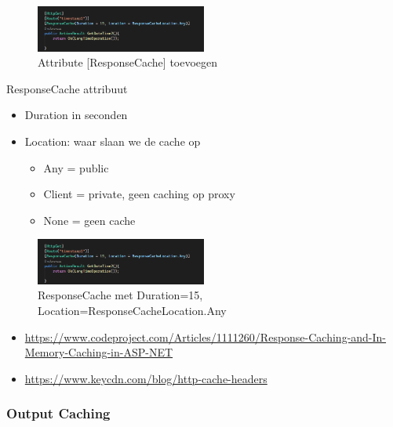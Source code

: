 \documentclass{article}
\begin{document}
\begin{figure}[H]
    \centering
    \includegraphics[width=0.5\textwidth]{caching-response-werking3.png}
    \caption{Attribute [ResponseCache] toevoegen}
\end{figure}

ResponseCache attribuut

\begin{itemize}
    \item Duration in seconden
    \item Location: waar slaan we de cache op
    \begin{itemize}
        \item Any = public
        \item Client = private, geen caching op proxy
        \item None = geen cache
    \end{itemize}
\end{itemize}

\begin{figure}[H]
    \centering
    \includegraphics[width=0.5\textwidth]{caching-response-attribute.png}
    \caption{ResponseCache met Duration=15, Location=ResponseCacheLocation.Any}
\end{figure}


\begin{itemize}
    \item \url{https://www.codeproject.com/Articles/1111260/Response-Caching-and-In-Memory-Caching-in-ASP-NET}
    \item \url{https://www.keycdn.com/blog/http-cache-headers}
\end{itemize}

\subsubsection{Output Caching}
\end{document}
